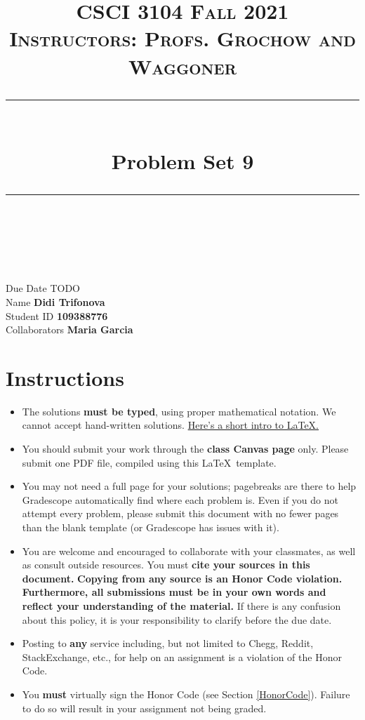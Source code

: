 \documentclass[11pt]{article}
\title{
\normalfont \normalsize 
\textsc{CSCI 3104 Fall 2021 \\ 
Instructors: Profs. Grochow and Waggoner} \\
[10pt] 
\rule{\linewidth}{0.5pt} \\[6pt] 
\huge Problem Set 9 \\
\rule{\linewidth}{2pt}  \\[10pt]
}
\date{}
\theoremstyle{definition}
\theoremstyle{definition}
\theoremstyle{definition}
\begin{document}
\maketitle


\noindent
Due Date \dotfill TODO \\
Name \dotfill \textbf{Didi Trifonova} \\
Student ID \dotfill \textbf{109388776} \\
Collaborators \dotfill \textbf{Maria Garcia}

\tableofcontents

\section{Instructions}
 \begin{itemize}
	\item The solutions \textbf{must be typed}, using proper mathematical notation. We cannot accept hand-written solutions. \href{http://ece.uprm.edu/~caceros/latex/introduction.pdf}{Here's a short intro to \LaTeX.}
	\item You should submit your work through the \textbf{class Canvas page} only. Please submit one PDF file, compiled using this \LaTeX \ template.
	\item You may not need a full page for your solutions; pagebreaks are there to help Gradescope automatically find where each problem is. Even if you do not attempt every problem, please submit this document with no fewer pages than the blank template (or Gradescope has issues with it).

	\item You are welcome and encouraged to collaborate with your classmates, as well as consult outside resources. You must \textbf{cite your sources in this document.} \textbf{Copying from any source is an Honor Code violation. Furthermore, all submissions must be in your own words and reflect your understanding of the material.} If there is any confusion about this policy, it is your responsibility to clarify before the due date. 

	\item Posting to \textbf{any} service including, but not limited to Chegg, Reddit, StackExchange, etc., for help on an assignment is a violation of the Honor Code.

	\item You \textbf{must} virtually sign the Honor Code (see Section \ref{HonorCode}). Failure to do so will result in your assignment not being graded.
\end{itemize}
\end{document}
